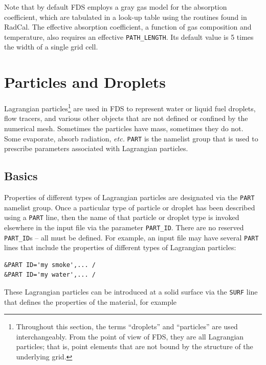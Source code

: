 \documentclass[11pt]{book}
\newcommand{\ct}{\tt\small}
\begin{document}
Note that by default FDS employs a gray gas model for the absorption coefficient, which are
tabulated in a look-up table using the routines found in RadCal. The effective absorption coefficient, a function
of gas composition and temperature, also requires an effective {\ct PATH\_LENGTH}. Its default value is
5 times the width of a single grid cell.







\clearpage

\chapter{Particles and Droplets}
\label{info:PART}

Lagrangian particles\footnote{Throughout this section, the terms ``droplets'' and ``particles'' are used interchangeably. From the point of view of
FDS, they are all Lagrangian particles; that is, point elements that are not bound by the structure of the underlying grid.} are used in FDS to represent
water or liquid fuel
droplets, flow tracers, and various other objects that are not defined or confined by the numerical mesh. Sometimes the
particles have mass, sometimes they do not. Some evaporate,
absorb radiation, {\em etc.}
{\ct PART} is the namelist group that is used to prescribe
parameters associated with Lagrangian particles.



\section{Basics}

\label{info:PART_Basics}

Properties of different types of
Lagrangian particles are designated via the {\ct PART} namelist group.
Once a particular type of particle or droplet has been described using
a {\ct PART} line, then the name of that particle or droplet type is invoked
elsewhere in the input file via the parameter {\ct PART\_ID}. There are no reserved {\ct PART\_ID}s -- all must be defined.
For example, an input file may have several {\ct PART} lines that include the
properties of different types of Lagrangian particles:

\footnotesize
\begin{verbatim}
&PART ID='my smoke',... /
&PART ID='my water',... /
\end{verbatim}
\normalsize
These Lagrangian particles can be introduced at a solid surface via the {\ct SURF} line
that defines the properties of the material, for example
\end{document}
